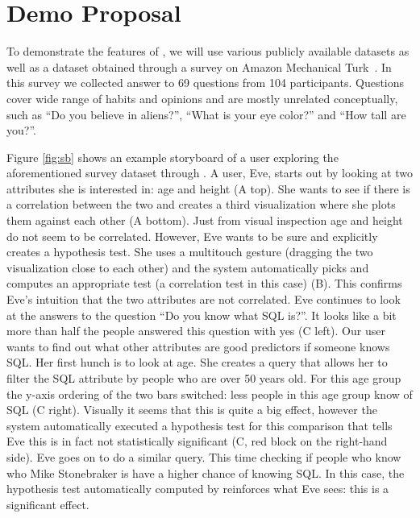 \section{Demo Proposal}
\label{sec:scenarios}

To demonstrate the features of \system{}, we will use various publicly available datasets as well as a dataset obtained through a survey on Amazon Mechanical Turk~\cite{binnig2017sustainable}. In this survey we collected answer to 69 questions from 104 participants. Questions cover wide range of habits and opinions and are mostly unrelated conceptually, such as ``Do you believe in aliens?'',  ``What is your eye color?'' and ``How tall are you?''. 

Figure \ref{fig:sb} shows an example storyboard of a user exploring the aforementioned survey dataset through \system{}. A user, Eve, starts out by looking at two attributes she is interested in: age and height (A top). She wants to see if there is a correlation between the two and creates a third visualization where she plots them against each other (A bottom). Just from visual inspection age and height do not seem to be correlated. However, Eve wants to be sure and explicitly creates a hypothesis test. She uses a multitouch gesture (dragging the two visualization close to each other) and the system automatically picks and computes an appropriate test (a correlation test in this case) (B). This confirms Eve's intuition that the two attributes are not correlated. Eve continues to look at the answers to the question ``Do you know what SQL is?''. It looks like a bit more than half the people answered this question with yes (C left). Our user wants to find out what other attributes are good predictors if someone knows SQL. Her first hunch is to look at age. She creates a query that allows her to filter the SQL attribute by people who are over 50 years old. For this age group the y-axis ordering of the two bars switched: less people in this age group know of SQL (C right). Visually it seems that this is quite a big effect, however the system automatically executed a hypothesis test for this comparison that tells Eve this is in fact not statistically significant (C, red block on the right-hand side). Eve goes on to do a similar query. This time checking if people who know who Mike Stonebraker is have a higher chance of knowing SQL. In this case, the hypothesis test automatically computed by \system{} reinforces what Eve sees: this is a significant effect. 

